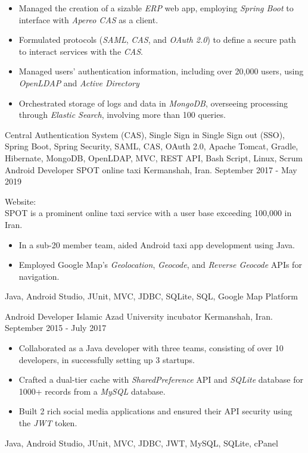 \begin{experiences}
{\begin{itemize}
\item Managed the creation of a sizable \emph{ERP} web app, employing \emph{Spring Boot} to interface with \emph{Apereo CAS} as a client.
\item Formulated protocols (\emph{SAML}, \emph{CAS}, and \emph{OAuth 2.0}) to define a secure path to interact services with the \textit{CAS}.
\item Managed users' authentication information, including over 20,000 users, using \emph{OpenLDAP} and \emph{Active Directory}
\item Orchestrated storage of logs and data in \emph{MongoDB}, overseeing processing through \emph{Elastic Search}, involving more than 100 queries.
\end{itemize}
}{Central Authentication System (CAS), Single Sign in Single Sign out (SSO), Spring Boot, Spring Security, SAML, CAS, OAuth 2.0, Apache Tomcat, Gradle, Hibernate, MongoDB, OpenLDAP, MVC, REST API, Bash Script, Linux, Scrum}
\emptySeparator
\experience
  {}
  {Android Developer}
  {SPOT online taxi}
  {Kermanshah, Iran. \hspace{140 pt} September 2017 - May 2019}
  {}
  {
  Website: \\
  SPOT is a prominent online taxi service with a user base exceeding 100,000 in Iran. 
  \begin{itemize}
    \item In a sub-20 member team, aided Android taxi app development using Java.
    \item Employed Google Map's \emph{Geolocation}, \emph{Geocode}, and \emph{Reverse Geocode} APIs for navigation.\end{itemize}
  }{Java, Android Studio, JUnit, MVC, JDBC, SQLite, SQL, Google Map Platform}

\emptySeparator

\experience
{}
{Android Developer}
{Islamic Azad University incubator}
{Kermanshah, Iran. \hspace{60 pt} September 2015 - July 2017}
{}
{
\begin{itemize}
\item Collaborated as a Java developer with three teams, consisting of over 10 developers, in successfully setting up 3 startups.
\item Crafted a dual-tier cache with \emph{SharedPreference} API and \emph{SQLite} database for 1000+ records from a \emph{MySQL} database.
\item Built 2 rich social media applications and ensured their API security using the \emph{JWT} token.
\end{itemize}
}{Java, Android Studio, JUnit, MVC, JDBC, JWT, MySQL, SQLite, cPanel}
\end{experiences}